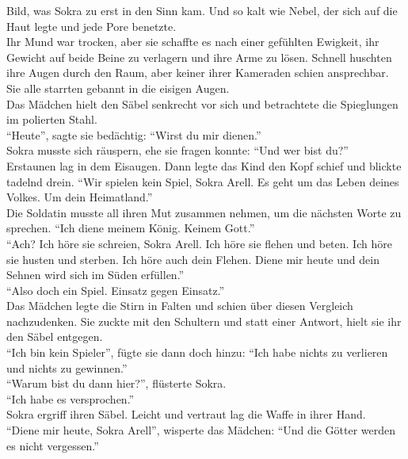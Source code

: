 Bild, was Sokra zu erst in den Sinn kam. Und so kalt wie Nebel, der sich auf die Haut legte und 
jede Pore benetzte.\\
Ihr Mund war trocken, aber sie schaffte es nach einer gefühlten Ewigkeit, ihr Gewicht auf beide 
Beine zu verlagern und ihre Arme zu lösen. Schnell huschten ihre Augen durch den Raum, aber keiner 
ihrer Kameraden schien ansprechbar. Sie alle starrten gebannt in die eisigen Augen.\\
Das Mädchen hielt den Säbel senkrecht vor sich und betrachtete die Spieglungen im polierten 
Stahl.\\
``Heute'', sagte sie bedächtig: ``Wirst du mir dienen.''\\
Sokra musste sich räuspern, ehe sie fragen konnte: ``Und wer bist du?''\\
Erstaunen lag in dem Eisaugen. Dann legte das Kind den Kopf schief und blickte tadelnd drein. ``Wir 
spielen kein Spiel, Sokra Arell. Es geht um das Leben deines Volkes. Um dein Heimatland.''\\
Die Soldatin musste all ihren Mut zusammen nehmen, um die nächsten Worte zu sprechen. ``Ich diene 
meinem König. Keinem Gott.''\\
``Ach? Ich höre sie schreien, Sokra Arell. Ich höre sie flehen und beten. Ich höre sie husten und 
sterben. Ich höre auch dein Flehen. Diene mir heute und dein Sehnen wird sich im Süden erfüllen.''\\
``Also doch ein Spiel. Einsatz gegen Einsatz.''\\
Das Mädchen legte die Stirn in Falten und schien über diesen Vergleich nachzudenken. Sie zuckte mit 
den Schultern und statt einer Antwort, hielt sie ihr den Säbel entgegen.\\
``Ich bin kein Spieler'', fügte sie dann doch hinzu: ``Ich habe nichts zu verlieren und nichts zu 
gewinnen.''\\
``Warum bist du dann hier?'', flüsterte Sokra.\\
``Ich habe es versprochen.''\\
Sokra ergriff ihren Säbel. Leicht und vertraut lag die Waffe in ihrer Hand.\\
``Diene mir heute, Sokra Arell'', wisperte das Mädchen: ``Und die Götter werden es nicht 
vergessen.''

